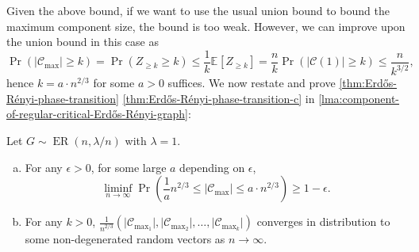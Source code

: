 Given the above bound, if we want to use the usual union bound to bound the maximum component size, the bound is too weak. However, we can improve upon the union bound in this case as
\[
	\Pr_{}(\lvert \mathcal{C} _{\max } \rvert \geq k)
	= \Pr_{}(Z_{\geq k} \geq k)
	\leq \frac{1}{k} \mathbb{E}_{}[Z_{\geq k}]
	= \frac{n}{k} \Pr_{}(\lvert \mathcal{C} (1) \rvert \geq k)
	\leq \frac{n}{k^{3 / 2}},
\]
hence \(k = a \cdot n^{2 / 3}\) for some \(a > 0\) suffices. We now restate and prove \autoref{thm:Erdős-Rényi-phase-transition} \autoref{thm:Erdős-Rényi-phase-transition-c} in \autoref{lma:component-of-regular-critical-Erdős-Rényi-graph}:

\begin{lemma}\label{lma:component-of-regular-critical-Erdős-Rényi-graph}
	Let \(G \sim \operatorname{ER}(n, \lambda / n) \) with \(\lambda = 1\).
	\begin{enumerate}[(a)]
		\item\label{lma:component-of-regular-critical-Erdős-Rényi-graph-a} For any \(\epsilon > 0\), for some large \(a\) depending on \(\epsilon \),
		      \[
			      \liminf_{n \to \infty} \Pr_{}\left( \frac{1}{a} n^{2 / 3} \leq \lvert \mathcal{C} _{\max } \rvert \leq a \cdot n^{2 / 3} \right)
			      \geq 1 - \epsilon.
		      \]
		\item\label{lma:component-of-regular-critical-Erdős-Rényi-graph-b} For any \(k>0\), \(\frac{1}{n^{2 / 3}} (\lvert \mathcal{C} _{\max _1} \rvert , \lvert \mathcal{C} _{\max _2} \rvert , \dots , \lvert \mathcal{C} _{\max _k} \rvert ) \) converges in distribution to some non-degenerated random vectors as \(n \to \infty \).
	\end{enumerate}
\end{lemma}
